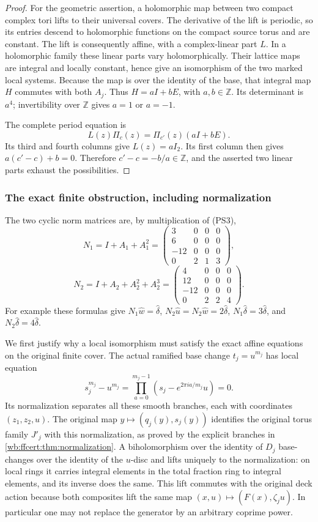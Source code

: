 \begin{proof}
For the geometric assertion, a holomorphic map between two compact
complex tori lifts to their universal covers. The derivative of the
lift is periodic, so its entries descend to holomorphic functions on
the compact source torus and are constant. The lift is consequently
affine, with a complex-linear part $L$. In a holomorphic family these
linear parts vary holomorphically. Their lattice maps are integral
and locally constant, hence give an isomorphism of the two marked
local systems. Because the map is over the identity of the base,
that integral map $H$ commutes with both $A_j$. Thus
$H=aI+bE$, with $a,b\in\mathbb Z$. Its determinant is $a^4$;
invertibility over $\mathbb Z$ gives $a=1$ or $a=-1$.

The complete period equation is
\[
                   L(z)\Pi_c(z)=\Pi_{c'}(z)(aI+bE).
 \tag{PS8}\label{wb:pshift:eq:period-morphism}
\]
Its third and fourth columns give $L(z)=aI_2$. Its first column
then gives $a(c'-c)+b=0$. Therefore $c'-c=-b/a\in\mathbb Z$,
and the asserted two linear parts exhaust the possibilities.
\end{proof}

\subsubsection{The exact finite obstruction, including normalization}

The two cyclic norm matrices are, by multiplication of (PS3),
\[
 N_1=I+A_1+A_1^2=
 \begin{pmatrix}3&0&0&0\\6&0&0&0\\-12&0&0&0\\0&2&1&3\end{pmatrix},
\]
\[
 N_2=I+A_2+A_2^2+A_2^3=
 \begin{pmatrix}4&0&0&0\\12&0&0&0\\-12&0&0&0\\0&2&2&4\end{pmatrix}.
 \tag{PS9}\label{wb:pshift:eq:norms}
\]
For example these formulas give
$N_1\widehat w=\widehat\delta$,
$N_2\widehat u=N_2\widehat w=2\widehat\delta$,
$N_1\widehat\delta=3\widehat\delta$, and
$N_2\widehat\delta=4\widehat\delta$.

We first justify why a local isomorphism must satisfy the exact affine
equations on the original finite cover. The actual ramified base change
$t_j=u^{m_j}$ has local equation
\[
 s_j^{m_j}-u^{m_j}
   =\prod_{a=0}^{m_j-1}(s_j-e^{2\pi ia/m_j}u)=0.
\]
Its normalization separates all these smooth branches, each with
coordinates $(z_1,z_2,u)$. The original map
$y\mapsto(q_j(y),s_j(y))$ identifies the original torus family $J'_j$
with this normalization, as proved by the explicit branches in
\cref{wb:ffcert:thm:normalization}. A biholomorphism over the identity of
$D_j$ base-changes over the identity of the $u$-disc and lifts uniquely
to the normalization: on local rings it carries integral elements in
the total fraction ring to integral elements, and its inverse does
the same. This lift commutes with the original deck action because
both composites lift the same map $(x,u)\mapsto(F(x),\zeta_j u)$.
In particular one may not replace the generator by an arbitrary
coprime power.

